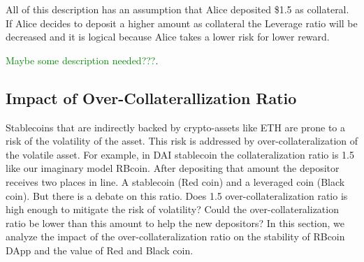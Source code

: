 All of this description has an assumption that Alice deposited \$1.5 as collateral. If Alice decides to deposit a higher amount as collateral the Leverage ratio will be decreased and it is logical because Alice takes a lower risk for lower reward.

\textcolor{green}{Maybe some description needed???}.

\subsection{Impact of Over-Collaterallization Ratio}
Stablecoins that are indirectly backed by crypto-assets like ETH are prone to a risk of the volatility of the asset. This risk is addressed by over-collateralization of the volatile asset. For example, in DAI stablecoin the collateralization ratio is 1.5 like our imaginary model RBcoin. After depositing that amount the depositor receives two places in line. A stablecoin (Red coin) and a leveraged coin (Black coin). But there is a debate on this ratio. Does 1.5 over-collateralization ratio is high enough to mitigate the risk of volatility? Could the over-collateralization ratio be lower than this amount to help the new depositors?
In this section, we analyze the impact of the over-collateralization ratio on the stability of RBcoin DApp and the value of Red and Black coin.

